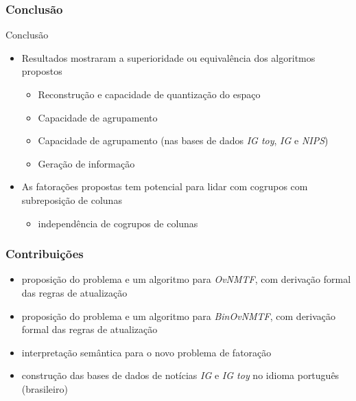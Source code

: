 \documentclass[10pt]{beamer}
\begin{document}
\begin{frame}
  \frametitle{Conclusão}

  \begin{block}{Conclusão}
    \begin{itemize}
      \item Resultados mostraram a superioridade ou equivalência dos algoritmos propostos
      \begin{itemize}
        \item Reconstrução e capacidade de quantização do espaço
        \item Capacidade de agrupamento
        \item Capacidade de agrupamento (nas bases de dados \textit{IG toy}, \textit{IG} e \textit{NIPS})
        \item Geração de informação
      \end{itemize}
      \item As fatorações propostas tem potencial para lidar com cogrupos com subreposição de colunas
      \begin{itemize}
        \item independência de cogrupos de colunas
      \end{itemize}
    \end{itemize}
  \end{block}


\end{frame}


\begin{frame}
  \frametitle{Contribuições}

  \begin{itemize}
    \item proposição do problema e um algoritmo para \textit{OvNMTF}, com derivação formal das regras de atualização
    \item proposição do problema e um algoritmo para \textit{BinOvNMTF}, com derivação formal das regras de atualização
    \item interpretação semântica para o novo problema de fatoração
    \item construção das bases de dados de notícias \textit{IG} e \textit{IG toy} no idioma português (brasileiro)
\end{itemize}

\end{frame}
\end{document}

